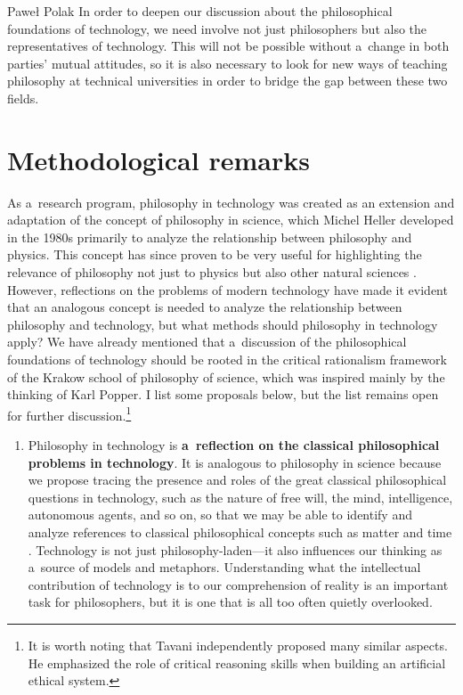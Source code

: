 \begin{artengenv}{Paweł Polak}
In order to deepen our discussion about the philosophical foundations of technology, we need involve not just philosophers but also the representatives of technology. This will not be possible without a~change in both parties' mutual attitudes, so it is also necessary to look for new ways of teaching philosophy at technical universities in order to bridge the gap between these two fields.



\section{Methodological remarks}

As a~research program, philosophy in technology was created as an extension and adaptation of the concept of philosophy in science, which Michel Heller developed in the 1980s primarily to analyze the relationship between philosophy and physics. This concept has since proven to be very useful for highlighting the relevance of philosophy not just to physics but also other natural sciences 
\parencites[e.g][]{brozek_philosophy_2011}[][]{polak_oblicza_2017}. %
 However, reflections on the problems of modern technology have made it evident that an analogous concept is needed to analyze the relationship between philosophy and technology, but what methods should philosophy in technology apply? We have already mentioned that a~discussion of the philosophical foundations of technology should be rooted in the critical rationalism framework of the Krakow school of philosophy of science, which was inspired mainly by the thinking of Karl Popper. I list some proposals below, but the list remains open for further discussion.\footnote{It is worth noting that Tavani 
\parencite*[][]{tavani_ethics_2013} %
 independently proposed many similar aspects. He emphasized the role of critical reasoning skills when building an artificial ethical system.}


\begin{enumerate}[label=(\Roman*)]
\item Philosophy in technology is \textbf{a~reflection on the classical philosophical problems in technology}. It is analogous to philosophy in science because we propose tracing the presence and roles of the great classical philosophical questions in technology, such as the nature of free will, the mind, intelligence, autonomous agents, and so on, so that we may be able to identify and analyze references to classical philosophical concepts such as matter and time 
\parencite[e.g][]{Bolter1984TuringsMan}. %
 Technology is not just philosophy-laden---it also influences our thinking as a~source of models and metaphors. Understanding what the intellectual contribution of technology is to our comprehension of reality is an important task for philosophers, but it is one that is all too often quietly overlooked.




\end{enumerate}
\end{artengenv}
